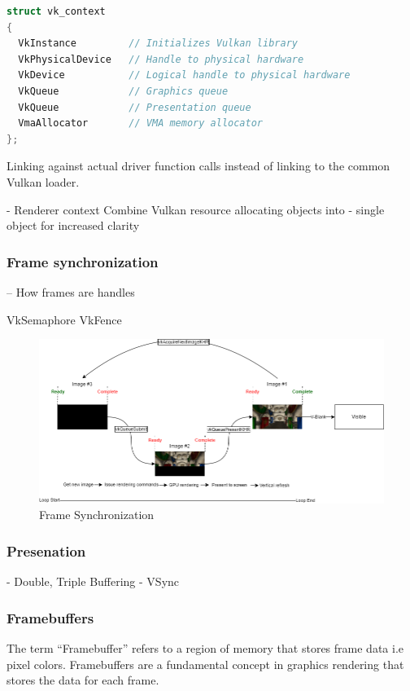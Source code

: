 \documentclass[11pt]{article}
\begin{document}
\begin{lstlisting}[language=C++]
struct vk_context
{
  VkInstance         // Initializes Vulkan library
  VkPhysicalDevice   // Handle to physical hardware
  VkDevice           // Logical handle to physical hardware
  VkQueue            // Graphics queue
  VkQueue            // Presentation queue
  VmaAllocator       // VMA memory allocator
};
\end{lstlisting}

Linking against actual driver function calls instead of linking to
the common Vulkan loader.  \cite{volk}


- Renderer context Combine Vulkan resource allocating objects into
-   single object for increased clarity 

\subsubsection{Frame synchronization}
-- How frames are handles

VkSemaphore
VkFence

\begin{figure}[h!]
  \centering
  \includegraphics[width=\textwidth]{images/frame_sync.png}
  \caption{Frame Synchronization}
  \label{fig:frame_sync}
\end{figure}



\subsubsection{Presenation}

- Double, Triple Buffering
- VSync

\subsubsection{Framebuffers}
The term ``Framebuffer'' refers to a region of memory that stores frame data i.e pixel colors.
Framebuffers are a fundamental concept in graphics rendering that stores the data for each frame.
\end{document}
